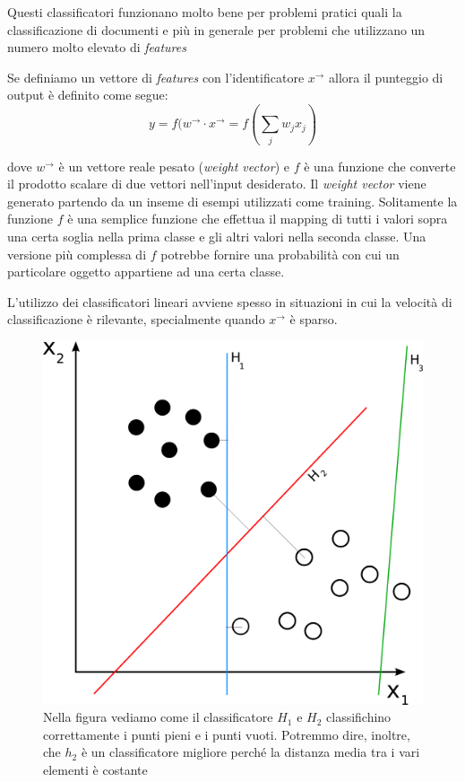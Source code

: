 \documentclass[a4paper,12pt,openright,twoside]{report}
\theoremstyle{definition}
\begin{document}
Questi classificatori funzionano molto bene per problemi pratici quali la classificazione di 
documenti e più in generale per problemi che utilizzano un numero molto elevato di \emph{features}

Se definiamo un vettore di \emph{features} con l'identificatore $x^\rightarrow$ allora il punteggio di output
è definito come segue:
\begin{equation}
	y=f(w^\rightarrow \cdot x^\rightarrow = f (\sum_j w_jx_j)
	\label{output score}
\end{equation}

dove $w^\rightarrow$ è un vettore reale pesato (\emph{weight vector}) e $f$ è una 
funzione che converte il prodotto scalare di due vettori nell'input desiderato.
Il \emph{weight vector} viene generato partendo da un inseme di esempi utilizzati come training. Solitamente
la funzione $f$ è una semplice funzione
che effettua il mapping di tutti i valori sopra una certa soglia nella prima classe e gli altri valori nella
seconda classe. Una versione più complessa di $f$ potrebbe fornire una probabilità con cui un particolare
oggetto appartiene ad una certa classe.

L'utilizzo dei classificatori lineari avviene spesso in situazioni in cui la velocità di classificazione
è rilevante, specialmente quando $x^\rightarrow$ è sparso.
\begin{figure}[ht]
	\centering
	\includegraphics[scale=0.2]{Immagini/liblinear_esempio.png}
	\caption{Nella figura vediamo come il classificatore $H_1$ e $H_2$ classifichino
	correttamente i punti pieni e i punti vuoti. Potremmo dire, inoltre, che $h_2$
	è un classificatore migliore perché la distanza media tra i vari elementi è costante}
	\label{fig:liblinearEx}
\end{figure}
\end{document}

